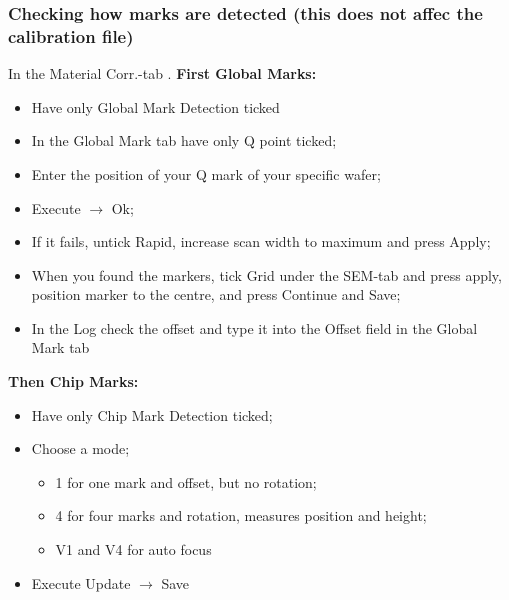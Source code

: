 \subsubsection{Checking how marks are detected (this does not affec the calibration file)}
In  the {Material  Corr.}-tab \ira  {}.
\textbf{First Global Marks:}
\begin{itemize}
\item Have only {Global Mark Detection} ticked
\item In the {Global Mark} tab have only Q point ticked;
\item Enter the position of your Q mark of your specific wafer;
\item Execute $\rightarrow$ Ok;
\item If it  fails, untick Rapid, increase scan width  to maximum and
  press Apply;
\item When  you found the  markers, tick  Grid under the  SEM-tab and
  press apply, position marker to  the centre, and press Continue and
  Save;
\item In the {Log} check the offset and type it into the Offset field
  in the Global Mark tab
  \begin{framed}\noindent
  \end{framed}
\end{itemize}
\textbf{Then Chip Marks:}
\begin{itemize}
\item Have only {Chip Mark Detection} ticked;
\item Choose a mode;
  \begin{itemize}
  \item 1 for one mark and offset, but no rotation;
  \item 4 for four marks and rotation, measures position and height;
  \item V1 and V4 for auto focus
  \end{itemize}
\item Execute \ira Update $\rightarrow$ Save
\end{itemize}

